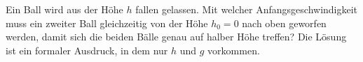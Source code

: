 Ein Ball wird aus der Höhe $h$ fallen gelassen. Mit welcher Anfangsgeschwindigkeit muss ein zweiter Ball gleichzeitig von der Höhe $h_0 = 0$ nach oben geworfen werden, damit sich die beiden Bälle genau auf halber Höhe treffen? Die Lösung ist ein formaler Ausdruck, in dem nur $h$ und $g$ vorkommen.
